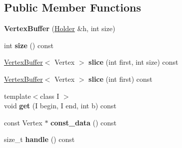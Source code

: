 \subsection*{Public Member Functions}
\begin{DoxyCompactItemize}
\item 
\hypertarget{class_tempest_1_1_vertex_buffer_a2d13a6751b6cb8314f2d8fc39a82784e}{{\bfseries Vertex\+Buffer} (\hyperlink{class_tempest_1_1_abstract_holder}{Holder} \&h, int size)}\label{class_tempest_1_1_vertex_buffer_a2d13a6751b6cb8314f2d8fc39a82784e}

\item 
\hypertarget{class_tempest_1_1_vertex_buffer_ae386fecb433589b8ae733837205120f6}{int {\bfseries size} () const }\label{class_tempest_1_1_vertex_buffer_ae386fecb433589b8ae733837205120f6}

\item 
\hypertarget{class_tempest_1_1_vertex_buffer_a1164e926ce9eab39a9778d0749877c00}{\hyperlink{class_tempest_1_1_vertex_buffer}{Vertex\+Buffer}$<$ Vertex $>$ {\bfseries slice} (int first, int size) const }\label{class_tempest_1_1_vertex_buffer_a1164e926ce9eab39a9778d0749877c00}

\item 
\hypertarget{class_tempest_1_1_vertex_buffer_a67383f8e78c7266fd6c749c35eae8d7c}{\hyperlink{class_tempest_1_1_vertex_buffer}{Vertex\+Buffer}$<$ Vertex $>$ {\bfseries slice} (int first) const }\label{class_tempest_1_1_vertex_buffer_a67383f8e78c7266fd6c749c35eae8d7c}

\item 
\hypertarget{class_tempest_1_1_vertex_buffer_ad0a4e3dddb6f86a13acd27cd126d8cc4}{{\footnotesize template$<$class I $>$ }\\void {\bfseries get} (I begin, I end, int b) const }\label{class_tempest_1_1_vertex_buffer_ad0a4e3dddb6f86a13acd27cd126d8cc4}

\item 
\hypertarget{class_tempest_1_1_vertex_buffer_ad5c1a40879a402ee1496f48566ca3a73}{const Vertex $\ast$ {\bfseries const\+\_\+data} () const }\label{class_tempest_1_1_vertex_buffer_ad5c1a40879a402ee1496f48566ca3a73}

\item 
\hypertarget{class_tempest_1_1_vertex_buffer_a26c6be60d00ace046227a044331c0c68}{size\+\_\+t {\bfseries handle} () const }\label{class_tempest_1_1_vertex_buffer_a26c6be60d00ace046227a044331c0c68}

\end{DoxyCompactItemize}
